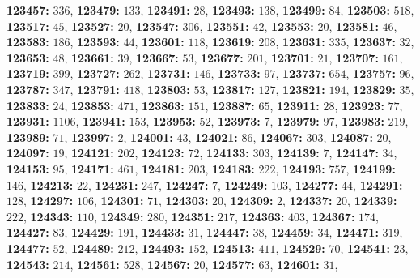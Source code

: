 \textsf{\bfseries 123457:} $336$, \textsf{\bfseries 123479:} $133$, \textsf{\bfseries 123491:} $28$, \textsf{\bfseries 123493:} $138$, \textsf{\bfseries 123499:} $84$, \textsf{\bfseries 123503:} $518$, \textsf{\bfseries 123517:} $45$, \textsf{\bfseries 123527:} $20$, \textsf{\bfseries 123547:} $306$, \textsf{\bfseries 123551:} $42$, \textsf{\bfseries 123553:} $20$, \textsf{\bfseries 123581:} $46$, \textsf{\bfseries 123583:} $186$, \textsf{\bfseries 123593:} $44$, \textsf{\bfseries 123601:} $118$, \textsf{\bfseries 123619:} $208$, \textsf{\bfseries 123631:} $335$, \textsf{\bfseries 123637:} $32$, \textsf{\bfseries 123653:} $48$, \textsf{\bfseries 123661:} $39$, \textsf{\bfseries 123667:} $53$, \textsf{\bfseries 123677:} $201$, \textsf{\bfseries 123701:} $21$, \textsf{\bfseries 123707:} $161$, \textsf{\bfseries 123719:} $399$, \textsf{\bfseries 123727:} $262$, \textsf{\bfseries 123731:} $146$, \textsf{\bfseries 123733:} $97$, \textsf{\bfseries 123737:} $654$, \textsf{\bfseries 123757:} $96$, \textsf{\bfseries 123787:} $347$, \textsf{\bfseries 123791:} $418$, \textsf{\bfseries 123803:} $53$, \textsf{\bfseries 123817:} $127$, \textsf{\bfseries 123821:} $194$, \textsf{\bfseries 123829:} $35$, \textsf{\bfseries 123833:} $24$, \textsf{\bfseries 123853:} $471$, \textsf{\bfseries 123863:} $151$, \textsf{\bfseries 123887:} $65$, \textsf{\bfseries 123911:} $28$, \textsf{\bfseries 123923:} $77$, \textsf{\bfseries 123931:} $1106$, \textsf{\bfseries 123941:} $153$, \textsf{\bfseries 123953:} $52$, \textsf{\bfseries 123973:} $7$, \textsf{\bfseries 123979:} $97$, \textsf{\bfseries 123983:} $219$, \textsf{\bfseries 123989:} $71$, \textsf{\bfseries 123997:} $2$, \textsf{\bfseries 124001:} $43$, \textsf{\bfseries 124021:} $86$, \textsf{\bfseries 124067:} $303$, \textsf{\bfseries 124087:} $20$, \textsf{\bfseries 124097:} $19$, \textsf{\bfseries 124121:} $202$, \textsf{\bfseries 124123:} $72$, \textsf{\bfseries 124133:} $303$, \textsf{\bfseries 124139:} $7$, \textsf{\bfseries 124147:} $34$, \textsf{\bfseries 124153:} $95$, \textsf{\bfseries 124171:} $461$, \textsf{\bfseries 124181:} $203$, \textsf{\bfseries 124183:} $222$, \textsf{\bfseries 124193:} $757$, \textsf{\bfseries 124199:} $146$, \textsf{\bfseries 124213:} $22$, \textsf{\bfseries 124231:} $247$, \textsf{\bfseries 124247:} $7$, \textsf{\bfseries 124249:} $103$, \textsf{\bfseries 124277:} $44$, \textsf{\bfseries 124291:} $128$, \textsf{\bfseries 124297:} $106$, \textsf{\bfseries 124301:} $71$, \textsf{\bfseries 124303:} $20$, \textsf{\bfseries 124309:} $2$, \textsf{\bfseries 124337:} $20$, \textsf{\bfseries 124339:} $222$, \textsf{\bfseries 124343:} $110$, \textsf{\bfseries 124349:} $280$, \textsf{\bfseries 124351:} $217$, \textsf{\bfseries 124363:} $403$, \textsf{\bfseries 124367:} $174$, \textsf{\bfseries 124427:} $83$, \textsf{\bfseries 124429:} $191$, \textsf{\bfseries 124433:} $31$, \textsf{\bfseries 124447:} $38$, \textsf{\bfseries 124459:} $34$, \textsf{\bfseries 124471:} $319$, \textsf{\bfseries 124477:} $52$, \textsf{\bfseries 124489:} $212$, \textsf{\bfseries 124493:} $152$, \textsf{\bfseries 124513:} $411$, \textsf{\bfseries 124529:} $70$, \textsf{\bfseries 124541:} $23$, \textsf{\bfseries 124543:} $214$, \textsf{\bfseries 124561:} $528$, \textsf{\bfseries 124567:} $20$, \textsf{\bfseries 124577:} $63$, \textsf{\bfseries 124601:} $31$, 
